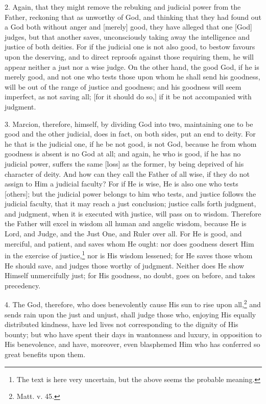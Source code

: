 2. Again, that they might remove the rebuking and judicial power from the Father, reckoning that as unworthy of God, and thinking that they had found out a God both without anger and [merely] good, they have alleged that one [God] judges, but that another saves, unconsciously taking away the intelligence and justice of both deities. For if the judicial one is not also good, to bestow favours upon the deserving, and to direct reproofs against those requiring them, he will appear neither a just nor a wise judge. On the other hand, the good God, if he is merely good, and not one who tests those upon whom he shall send his goodness, will be out of the range of justice and goodness; and his goodness will seem imperfect, as not saving all; [for it should do so,] if it be not accompanied with judgment.

3. Marcion, therefore, himself, by dividing God into two, maintaining one to be good and the other judicial, does in fact, on both sides, put an end to deity. For he that is the judicial one, if he be not good, is not God, because he from whom goodness is absent is no God at all; and again, he who is good, if he has no judicial power, suffers the same [loss] as the former, by being deprived of his character of deity. And how can they call the Father of all wise, if they do not assign to Him a judicial faculty? For if He is wise, He is also one who tests [others]; but the judicial power belongs to him who tests, and justice follows the judicial faculty, that it may reach a just conclusion; justice calls forth judgment, and judgment, when it is executed with justice, will pass on to wisdom. Therefore the Father will excel in wisdom all human and angelic wisdom, because He is Lord, and Judge, and the Just One, and Ruler over all. For He is good, and merciful, and patient, and saves whom He ought: nor does goodness desert Him in the exercise of justice,\footnote{The text is here very uncertain, but the above seems the probable meaning.} nor is His wisdom lessened; for He saves those whom He should save, and judges those worthy of judgment. Neither does He show Himself unmercifully just; for His goodness, no doubt, goes on before, and takes precedency.

4. The God, therefore, who does benevolently cause His sun to rise upon all,\footnote{Matt. v. 45.} and sends rain upon the just and unjust, shall judge those who, enjoying His equally distributed kindness, have led lives not corresponding to the dignity of His bounty; but who have spent their days in wantonness and luxury, in opposition to His benevolence, and have, moreover, even blasphemed Him who has conferred so great benefits upon them.

